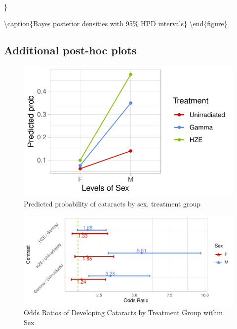 \documentclass[12pt]{article}
\begin{document}
\}

\textbackslash caption\{Bayes posterior densities with 95\% HPD intervals\}\label{fig:postdens}
\textbackslash end\{figure\}

\hypertarget{additional-post-hoc-plots}{%
\subsection{Additional post-hoc plots}\label{additional-post-hoc-plots}}

\label{sec:phs}

\begin{figure}[H]

{\centering \includegraphics{bookdown_report_files/figure-latex/contr-1} 

}

\caption{Predicted probability of cataracts by sex, treatment group}\label{fig:contr}
\end{figure}

\begin{figure}[H]

{\centering \includegraphics{bookdown_report_files/figure-latex/oddsr-1} 

}

\caption{Odds Ratios of Developing Cataracts 
by Treatment Group within Sex}\label{fig:oddsr}
\end{figure}
\end{document}
